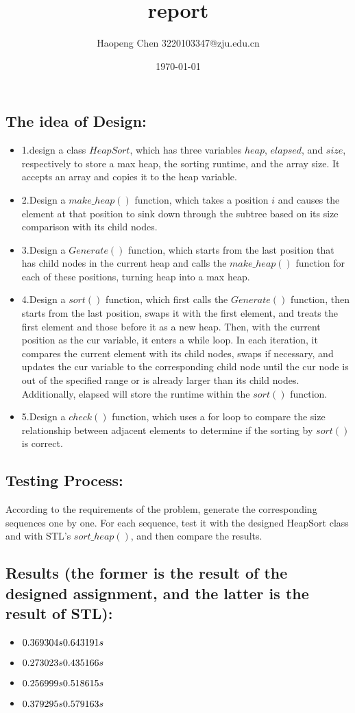 \documentclass[a4paper]{article}
\begin{document}
\title{report}
\author{Haopeng Chen 3220103347@zju.edu.cn}
\date{\today}
\maketitle
\subsection*{The idea of Design:}
\begin{itemize}
\item 1.design a class $HeapSort$, which has three variables $heap$, $elapsed$, and $size$, respectively to store a max heap, the sorting runtime, and the array size. It accepts an array and copies it to the heap variable.  

\item 2.Design a $make\_heap()$ function, which takes a position $i$ and causes the element at that position to sink down through the subtree based on its size comparison with its child nodes.

\item 3.Design a $Generate()$ function, which starts from the last position that has child nodes in the current heap and calls the $make\_heap()$ function for each of these positions, turning heap into a max heap.

\item 4.Design a $sort()$ function, which first calls the $Generate()$ function, then starts from the last position, swaps it with the first element, and treats the first element and those before it as a new heap. Then, with the current position as the cur variable, it enters a while loop. In each iteration, it compares the current element with its child nodes, swaps if necessary, and updates the cur variable to the corresponding child node until the cur node is out of the specified range or is already larger than its child nodes. Additionally, elapsed will store the runtime within the $sort()$ function.  

\item 5.Design a $check()$ function, which uses a for loop to compare the size relationship between adjacent elements to determine if the sorting by $sort()$ is correct.
\end{itemize}

\subsection*{Testing Process:} 
According to the requirements of the problem, generate the corresponding sequences one by one. For each sequence, test it with the designed HeapSort class and with STL's $sort\_heap()$, and then compare the results. 

\subsection*{Results (the former is the result of the designed assignment, and the latter is the result of STL):} 
\begin{itemize}
\item $0.369304s \space 0.643191s$
\item $0.273023s \space 0.435166s$
\item $0.256999s \space 0.518615s$
\item $0.379295s \space 0.579163s$
\end{itemize}
\end{document}
